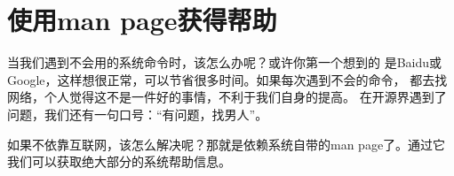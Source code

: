 \section{使用man page获得帮助}
\label{sec:getHelp}

当我们遇到不会用的系统命令时，该怎么办呢？或许你第一个想到的
是Baidu或Google，这样想很正常，可以节省很多时间。如果每次遇到不会的命令，
都去找网络，个人觉得这不是一件好的事情，不利于我们自身的提高。
在开源界遇到了问题，我们还有一句口号：“有问题，找男人”。

如果不依靠互联网，该怎么解决呢？那就是依赖系统自带的man page了。通过它我们可以获取绝大部分的系统帮助信息。
